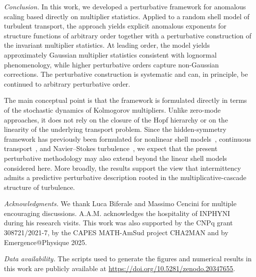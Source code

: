 \documentclass[aps,twocolumn,superscriptaddress]{revtex4-2}
\begin{document}
\textit{Conclusion.}
In this work, we developed a perturbative framework for anomalous scaling based directly on multiplier statistics. Applied to a random shell model of turbulent transport, the approach yields explicit anomalous exponents for structure functions of arbitrary order together with a perturbative construction of the invariant multiplier statistics. At leading order, the model yields approximately Gaussian multiplier statistics consistent with lognormal phenomenology, while higher perturbative orders capture non-Gaussian corrections. The perturbative construction is systematic and can, in principle, be continued to arbitrary perturbative order.

The main conceptual point is that the framework is formulated directly in terms of the stochastic dynamics of Kolmogorov multipliers. Unlike zero-mode approaches, it does not rely on the closure of the Hopf hierarchy or on the linearity of the underlying transport problem. Since the hidden-symmetry framework has previously been formulated for nonlinear shell models~\cite{mailybaev2022shell}, continuous transport~\cite{calascibetta2025hidden}, and Navier--Stokes turbulence~\cite{mailybaev2022hiddenMT,magacho2025scale}, we expect that the present perturbative methodology may also extend beyond the linear shell models considered here.
More broadly, the results support the view that intermittency admits a predictive perturbative description rooted in the multiplicative-cascade structure of turbulence.

\bigskip
\noindent\textit{Acknowledgments.}
We thank Luca Biferale and Massimo Cencini for multiple encouraging discussions.
A.A.M. acknowledges the hospitality of INPHYNI  during his research visits. This work was also supported by the CNPq grant 308721/2021-7, by the CAPES MATH-AmSud project CHA2MAN and by Emergence@Physique 2025.

\bigskip
\noindent\textit{Data availability.}
The scripts used to generate the figures and numerical results in this work are publicly available at \url{https://doi.org/10.5281/zenodo.20347655}.







\clearpage
\onecolumngrid


\setcounter{page}{1}
\setcounter{equation}{0}
\setcounter{figure}{0}
\setcounter{table}{0}
\setcounter{section}{0}


\renewcommand{\theequation}{S\arabic{equation}}
\renewcommand{\thefigure}{S\arabic{figure}}
\renewcommand{\thetable}{S\arabic{table}}
\end{document}
